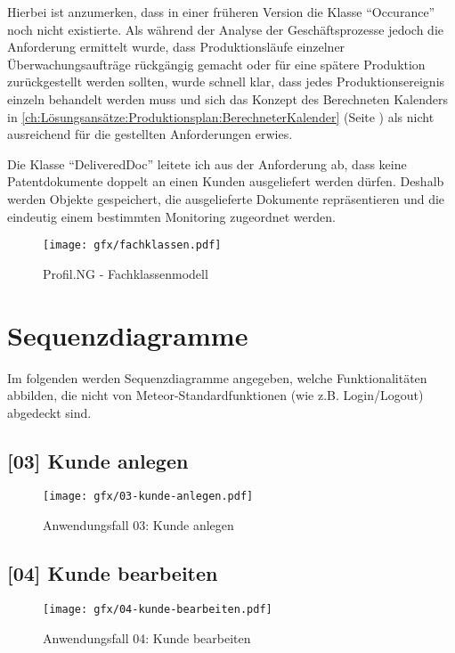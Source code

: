 Hierbei ist anzumerken, dass in einer früheren Version die Klasse "`Occurance"'
noch nicht existierte. Als während der Analyse der Geschäftsprozesse jedoch die
Anforderung ermittelt wurde, dass Produktionsläufe einzelner
Überwachungsaufträge rückgängig gemacht oder für eine spätere Produktion
zurückgestellt werden sollten, wurde schnell klar, dass jedes
Produktionsereignis einzeln behandelt werden muss und sich das Konzept des
Berechneten Kalenders in
\autoref{ch:Lösungsansätze:Produktionsplan:BerechneterKalender} (Seite
\pageref{ch:Lösungsansätze:Produktionsplan:BerechneterKalender}) als nicht
ausreichend für die gestellten Anforderungen erwies.

Die Klasse "`DeliveredDoc"' leitete ich aus der Anforderung ab, dass keine
Patentdokumente doppelt an einen Kunden ausgeliefert werden dürfen. Deshalb
werden Objekte gespeichert, die ausgelieferte Dokumente repräsentieren und die
eindeutig einem bestimmten Monitoring zugeordnet werden.

\begin{figure}[H]
  \texttt{[image: gfx/fachklassen.pdf]}
  \caption{Profil.NG - Fachklassenmodell}
  \label{fig:PNGFachklassen}
\end{figure}

\section{Sequenzdiagramme}

Im folgenden werden Sequenzdiagramme angegeben, welche Funktionalitäten abbilden,
die nicht von Meteor-Standardfunktionen (wie z.B. Login/Logout) abgedeckt sind.

\subsection{[03] Kunde anlegen}

\begin{figure}[H]
  \texttt{[image: gfx/03-kunde-anlegen.pdf]}
  \caption{Anwendungsfall 03: Kunde anlegen}
  \label{fig:AF03}
\end{figure}

\subsection{[04] Kunde bearbeiten}

\begin{figure}[H]
  \texttt{[image: gfx/04-kunde-bearbeiten.pdf]}
  \caption{Anwendungsfall 04: Kunde bearbeiten}
  \label{fig:AF04}
\end{figure}

